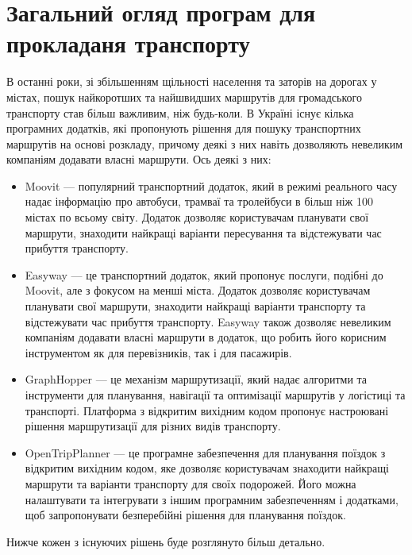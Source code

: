\section{Загальний огляд програм для прокладаня транспорту}
\label{sec:existing-sulutions}

В останні роки, зі збільшенням щільності населення та заторів на дорогах у містах, пошук найкоротших та найшвидших маршрутів для громадського транспорту став більш важливим, ніж будь-коли. В Україні існує кілька програмних додатків, які пропонують рішення для пошуку транспортних маршрутів на основі розкладу, причому деякі з них навіть дозволяють невеликим компаніям додавати власні маршрути. Ось деякі з них:


\begin{itemize}
  \item Moovit --- популярний транспортний додаток, який в режимі реального часу надає інформацію про автобуси, трамваї та тролейбуси в більш ніж 100 містах по всьому світу. Додаток дозволяє користувачам планувати свої маршрути, знаходити найкращі варіанти пересування та відстежувати час прибуття транспорту.

  \item Easyway --- це транспортний додаток, який пропонує послуги, подібні до Moovit, але з фокусом на менші міста. Додаток дозволяє користувачам планувати свої маршрути, знаходити найкращі варіанти транспорту та відстежувати час прибуття транспорту. Easyway також дозволяє невеликим компаніям додавати власні маршрути в додаток, що робить його корисним інструментом як для перевізників, так і для пасажирів.

  \item GraphHopper ---  це механізм маршрутизації, який надає алгоритми та інструменти для планування, навігації та оптимізації маршрутів у логістиці та транспорті. Платформа з відкритим вихідним кодом пропонує настроювані рішення маршрутизації для різних видів транспорту.

  \item OpenTripPlanner --- це програмне забезпечення для планування поїздок з відкритим вихідним кодом, яке дозволяє користувачам знаходити найкращі маршрути та варіанти транспорту для своїх подорожей. Його можна налаштувати та інтегрувати з іншим програмним забезпеченням і додатками, щоб запропонувати безперебійні рішення для планування поїздок.

\end{itemize}

Нижче кожен з існуючих рішень буде розглянуто більш детально.







